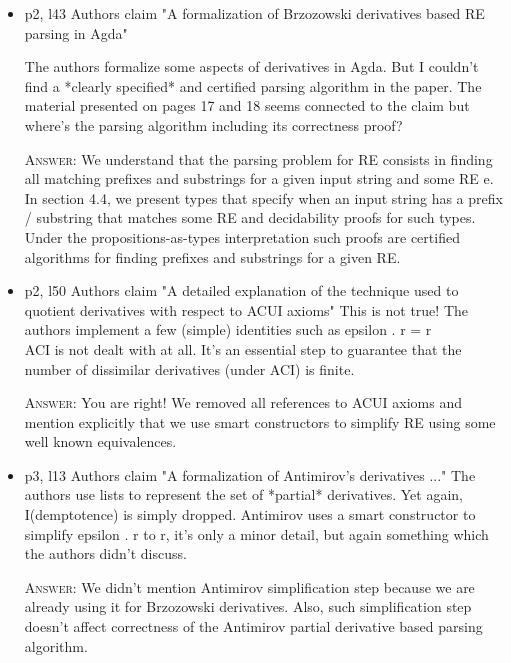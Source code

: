 \documentclass{article}
\begin{document}
\begin{itemize}

    \item p2, l43 Authors claim "A formalization of Brzozowski derivatives based RE parsing in Agda"

          The authors formalize some aspects of derivatives in Agda. But I couldn't find
          a *clearly specified* and certified parsing algorithm in the paper.
          The material presented on pages 17 and 18 seems connected to the claim but
          where's the parsing algorithm including its correctness proof?

    \textsc{Answer}: We understand that the parsing problem for RE consists in finding all matching prefixes and 
          substrings for a given input string and some RE e. In section 4.4, we present types that specify 
          when an input string has a prefix / substring that matches some RE and decidability proofs 
          for such types. Under the propositions-as-types interpretation such proofs are certified algorithms 
          for finding prefixes and substrings for a given RE.

     \item p2, l50 Authors claim "A detailed explanation of the technique used to quotient derivatives with respect to ACUI axioms"
           This is not true! The authors implement a few (simple) identities such as epsilon . r = r\\
           ACI is not dealt with at all. It's an essential step to guarantee that the number of dissimilar derivatives (under ACI) is finite.
           
    \textsc{Answer}: You are right! We removed all references to ACUI axioms and mention explicitly that we use smart constructors to 
           simplify RE using some well known equivalences.       
          

    \item p3, l13 Authors claim "A formalization of Antimirov's derivatives ..."
          The authors use lists to represent the set of *partial* derivatives. Yet again, I(demptotence) is simply dropped.
          Antimirov uses a smart constructor to simplify epsilon . r to r, it's only a minor detail, but again
          something which the authors didn't discuss.
          
    \textsc{Answer}: We didn't mention Antimirov simplification step because we are already using it for Brzozowski derivatives.
        Also, such simplification step doesn't affect correctness of the Antimirov partial derivative based parsing
        algorithm.
        

\end{itemize}
\end{document}
